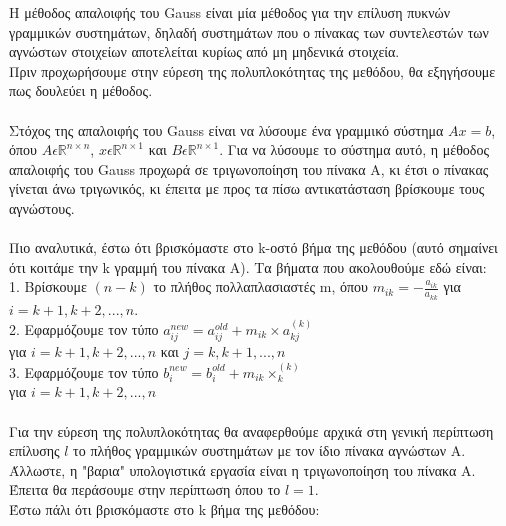 \documentclass[12pt]{article}
\newcommand{\R}{\mathbb{R}}
\begin{document}
Η μέθοδος απαλοιφής του Gauss είναι μία μέθοδος για την επίλυση πυκνών γραμμικών συστημάτων, δηλαδή συστημάτων που ο πίνακας των συντελεστών των αγνώστων στοιχείων αποτελείται κυρίως από μη μηδενικά στοιχεία. \\
Πριν προχωρήσουμε στην εύρεση της πολυπλοκότητας της μεθόδου, θα εξηγήσουμε πως δουλεύει η μέθοδος. \\ \\
Στόχος της απαλοιφής του Gauss είναι να λύσουμε ένα γραμμικό σύστημα $Ax = b$, όπου $A\epsilon \R^{n\times n}$, $x\epsilon \R^{n\times 1}$ και $B\epsilon \R^{n\times 1}$. Για να λύσουμε το σύστημα αυτό, η μέθοδος απαλοιφής του Gauss προχωρά σε τριγωνοποίηση του πίνακα A, κι έτσι ο πίνακας γίνεται άνω τριγωνικός, κι έπειτα με προς τα πίσω αντικατάσταση βρίσκουμε τους αγνώστους. \\ \\
Πιο αναλυτικά, έστω ότι βρισκόμαστε στο k-οστό βήμα της μεθόδου (αυτό σημαίνει ότι κοιτάμε την k γραμμή του πίνακα A). Τα βήματα που ακολουθούμε εδώ είναι: \\
1. Βρίσκουμε $(n-k)$ το πλήθος πολλαπλασιαστές m, όπου $m_{ik} = - \frac{a_{ik}}{a_{kk}}$ για $i=k+1,k+2,...,n$. \\
2. Εφαρμόζουμε τον τύπο $a_{ij}^{new} = a_{ij}^{old} + m_{ik}\times a_{kj}^{(k)}$ \\ για $i = k+1, k+2, ...,n$ και $j = k, k+1,...,n$ \\
3. Εφαρμόζουμε τον τύπο $b_{i}^{new} = b_{i}^{old} + m_{ik}\times _{k}^{(k)}$ \\ για $i = k+1, k+2, ...,n$ \\ \\
Για την εύρεση της πολυπλοκότητας θα αναφερθούμε αρχικά στη γενική περίπτωση επίλυσης $l$ το πλήθος γραμμικών συστημάτων με τον ίδιο πίνακα αγνώστων Α. Άλλωστε, η "βαρια" υπολογιστικά εργασία είναι η τριγωνοποίηση του πίνακα Α. Έπειτα θα περάσουμε στην περίπτωση όπου το $l=1$. \\
Έστω πάλι ότι βρισκόμαστε στο k βήμα της μεθόδου:
\end{document}
